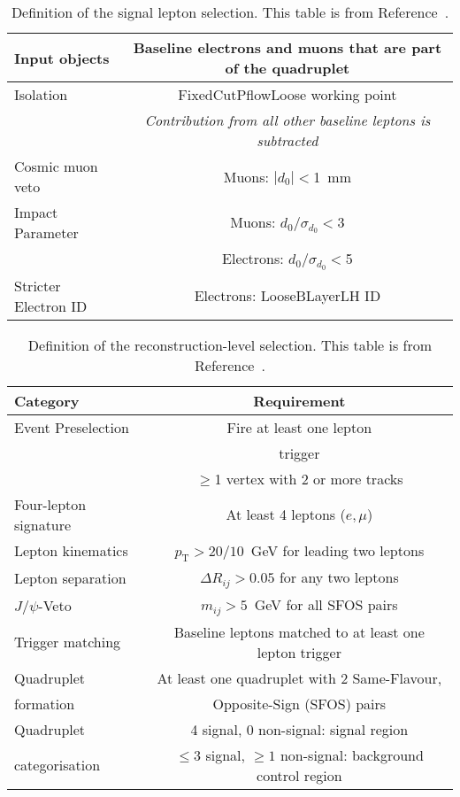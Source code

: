 \begin{table}[ht]
    \centering
        \begin{tabular}{l  c }
            Input objects &  Baseline electrons and muons that are part of the quadruplet \\ 
            \hline
            Isolation  &   FixedCutPflowLoose working point\\ %
                       &   \textit{Contribution from all other baseline leptons is subtracted} \\
            \hline    
            Cosmic muon veto & Muons: $|d_{0}| < $1~mm\\
            \hline
            Impact Parameter &  Muons: $d_{0}/\sigma_{d_{0}} < $3 \\
                             &  Electrons: $d_{0}/\sigma_{d_{0}} < $5 \\
            \hline
            Stricter Electron ID &  Electrons: LooseBLayerLH ID \\
        \end{tabular}
        \caption{Definition of the signal lepton selection. This table is from Reference~\cite{m4l_internalnote}.\label{tab:signalLeptons}}
\end{table}


\begin{table}[ht]
    \centering
        \begin{tabular}{l | c }
            Category & Requirement \\
            \hline
            Event Preselection & Fire at least one lepton \\
                                & trigger \\
                               & $\geq$1 vertex with 2 or more tracks \\[0.2cm]
            \hline
               Four-lepton signature & At least 4 leptons ($e,\mu$)    \\ 
               Lepton kinematics   &   $p_{\text{T}} > 20 / 10$~GeV{} for
                                     leading two leptons \\[0.2cm]
               Lepton separation               &   $\Delta R_{ij} > 0.05$ for any two leptons \\
              $J/\psi$-Veto &    $  m_{ij} > 5$~GeV for all SFOS pairs \\
            \hline 
               Trigger matching   & Baseline leptons matched to at least one lepton trigger \\[0.2cm] 
            \hline
              Quadruplet & At least one quadruplet with 2 Same-Flavour, \\
              formation & Opposite-Sign (SFOS) pairs \\
            \hline
              Quadruplet &  4 signal, 0 non-signal: signal region \\
              categorisation    &  $\leq 3$ signal, $\geq 1$ non-signal: background control region \\
        \end{tabular}
        \caption{Definition of the reconstruction-level selection. This table is from Reference~\cite{m4l_internalnote}.\label{tab:eventsel}}
\end{table}
